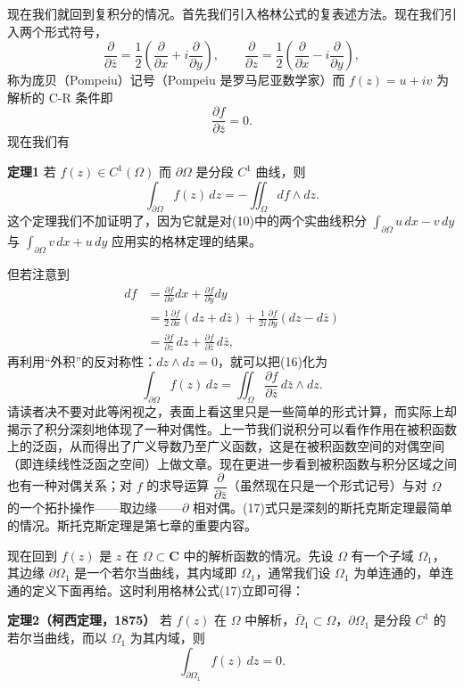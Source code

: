 现在我们就回到复积分的情况。首先我们引入格林公式的复表述方法。现在我们引入两个形式符号，
\[
 \frac{\partial}{\partial\bar z}
 =\frac12\left(\frac{\partial}{\partial x}+i\frac{\partial}{\partial y}\right),\qquad
 \frac{\partial}{\partial z}
 =\frac12\left(\frac{\partial}{\partial x}-i\frac{\partial}{\partial y}\right),
\]
称为庞贝（Pompeiu）记号（Pompeiu 是罗马尼亚数学家）而 $f(z)=u+iv$ 为解析的 C-R 条件即
\[
 \frac{\partial f}{\partial\bar z}=0.
\]
现在我们有

\noindent\textbf{定理1}
若 $f(z)\in C^1(\Omega)$ 而 $\partial\Omega$ 是分段 $C^1$ 曲线，则
\begin{equation}
 \int_{\partial\Omega}f(z)\,dz
 =-\iint_\Omega df\wedge dz.
 \tag{16}
\end{equation}
这个定理我们不加证明了，因为它就是对(10)中的两个实曲线积分 $\int_{\partial\Omega}u\,dx-v\,dy$ 与 $\int_{\partial\Omega}v\,dx+u\,dy$ 应用实的格林定理的结果。

但若注意到
\[
\begin{aligned}
 df&=\frac{\partial f}{\partial x}dx+\frac{\partial f}{\partial y}dy\\
 &=\frac12\frac{\partial f}{\partial x}(dz+d\bar z)
   +\frac1{2i}\frac{\partial f}{\partial y}(dz-d\bar z)\\
 &=\frac{\partial f}{\partial z}\,dz+
   \frac{\partial f}{\partial\bar z}\,d\bar z,
\end{aligned}
\]
再利用“外积”的反对称性：$dz\wedge dz=0$，就可以把(16)化为
\begin{equation}
 \int_{\partial\Omega}f(z)\,dz
 =\iint_\Omega\frac{\partial f}{\partial\bar z}\,d\bar z\wedge dz.
 \tag{17}
\end{equation}
请读者决不要对此等闲视之，表面上看这里只是一些简单的形式计算，而实际上却揭示了积分深刻地体现了一种对偶性。上一节我们说积分可以看作作用在被积函数上的泛函，从而得出了广义导数乃至广义函数，这是在被积函数空间的对偶空间（即连续线性泛函之空间）上做文章。现在更进一步看到被积函数与积分区域之间也有一种对偶关系；对 $f$ 的求导运算 $\dfrac{\partial}{\partial\bar z}$（虽然现在只是一个形式记号）与对 $\Omega$ 的一个拓扑操作——取边缘——$\partial$ 相对偶。(17)式只是深刻的斯托克斯定理最简单的情况。斯托克斯定理是第七章的重要内容。

现在回到 $f(z)$ 是 $z$ 在 $\Omega\subset\mathbf C$ 中的解析函数的情况。先设 $\Omega$ 有一个子域 $\Omega_1$，其边缘 $\partial\Omega_1$ 是一个若尔当曲线，其内域即 $\Omega_1$，通常我们设 $\Omega_1$ 为单连通的，单连通的定义下面再给。这时利用格林公式(17)立即可得：

\noindent\textbf{定理2（柯西定理，1875）}
若 $f(z)$ 在 $\Omega$ 中解析，$\bar\Omega_1\subset\Omega$，$\partial\Omega_1$ 是分段 $C^1$ 的若尔当曲线，而以 $\Omega_1$ 为其内域，则
\[
 \int_{\partial\Omega_1}f(z)\,dz=0.
\]

